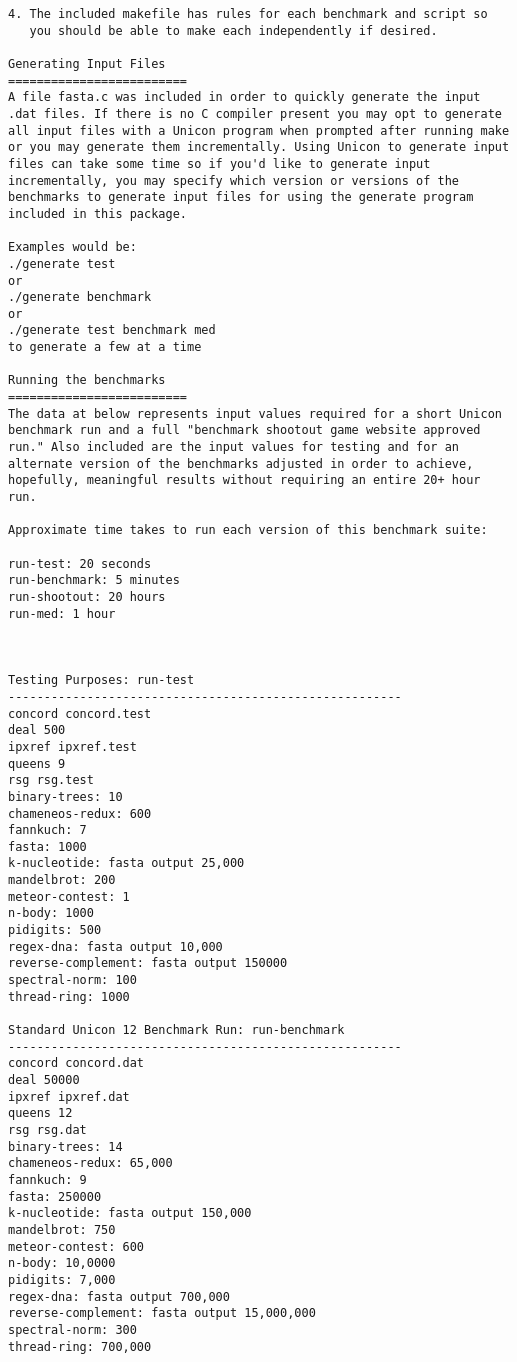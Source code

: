 \documentclass[letterpaper,12pt]{article}
\begin{document}
\begin{adjustwidth}{-.5cm}{-.5cm}
\begin{verbatim}
4. The included makefile has rules for each benchmark and script so
   you should be able to make each independently if desired.	 

Generating Input Files 
========================= 
A file fasta.c was included in order to quickly generate the input
.dat files. If there is no C compiler present you may opt to generate
all input files with a Unicon program when prompted after running make
or you may generate them incrementally. Using Unicon to generate input
files can take some time so if you'd like to generate input
incrementally, you may specify which version or versions of the
benchmarks to generate input files for using the generate program
included in this package.

Examples would be: 
./generate test 
or
./generate benchmark
or 
./generate test benchmark med
to generate a few at a time

Running the benchmarks 
========================= 
The data at below represents input values required for a short Unicon
benchmark run and a full "benchmark shootout game website approved
run." Also included are the input values for testing and for an
alternate version of the benchmarks adjusted in order to achieve,
hopefully, meaningful results without requiring an entire 20+ hour
run.

Approximate time takes to run each version of this benchmark suite:

run-test: 20 seconds
run-benchmark: 5 minutes
run-shootout: 20 hours
run-med: 1 hour



Testing Purposes: run-test 
-------------------------------------------------------
concord concord.test
deal 500
ipxref ipxref.test
queens 9
rsg rsg.test
binary-trees: 10    
chameneos-redux: 600    
fannkuch: 7    
fasta: 1000    
k-nucleotide: fasta output 25,000     
mandelbrot: 200     
meteor-contest: 1     
n-body: 1000    
pidigits: 500    
regex-dna: fasta output 10,000    
reverse-complement: fasta output 150000    
spectral-norm: 100    
thread-ring: 1000    

Standard Unicon 12 Benchmark Run: run-benchmark    
-------------------------------------------------------
concord concord.dat
deal 50000
ipxref ipxref.dat
queens 12
rsg rsg.dat
binary-trees: 14    
chameneos-redux: 65,000     
fannkuch: 9    
fasta: 250000    
k-nucleotide: fasta output 150,000     
mandelbrot: 750    
meteor-contest: 600    
n-body: 10,0000    
pidigits: 7,000    
regex-dna: fasta output 700,000    
reverse-complement: fasta output 15,000,000    
spectral-norm: 300    
thread-ring: 700,000    


\end{verbatim}
\end{adjustwidth}
\end{document}
